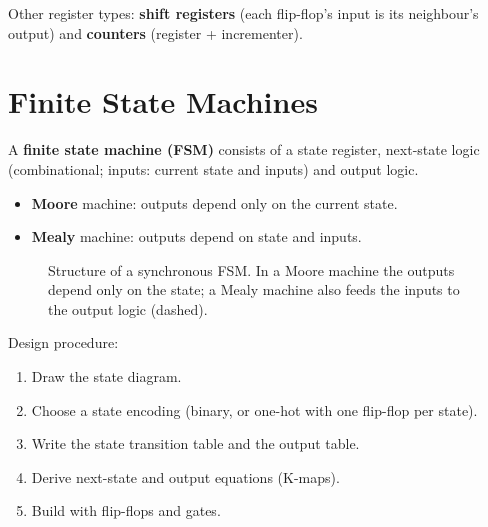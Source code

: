 Other register types: \textbf{shift registers} (each flip-flop's input is
its neighbour's output) and \textbf{counters} (register + incrementer).

\section{Finite State Machines}

\begin{definition}
A \textbf{finite state machine (FSM)} consists of a state register, next-state
logic (combinational; inputs: current state and inputs) and output logic.
\begin{itemize}
  \item \textbf{Moore} machine: outputs depend only on the current state.
  \item \textbf{Mealy} machine: outputs depend on state and inputs.
\end{itemize}
\end{definition}

\begin{figure}[H]
\centering
{}
\caption{Structure of a synchronous FSM. In a Moore machine the outputs
depend only on the state; a Mealy machine also feeds the inputs to the
output logic (dashed).}
\end{figure}

Design procedure:
\begin{enumerate}
  \item Draw the state diagram.
  \item Choose a state encoding (binary, or one-hot with one flip-flop per state).
  \item Write the state transition table and the output table.
  \item Derive next-state and output equations (K-maps).
  \item Build with flip-flops and gates.
\end{enumerate}


